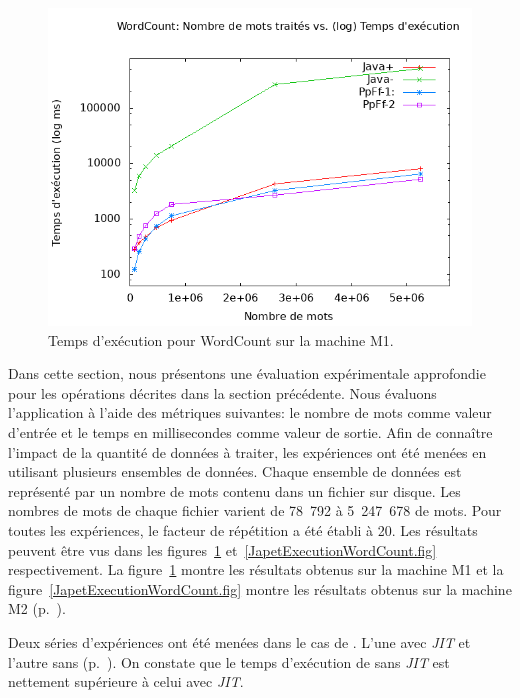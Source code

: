 \begin{figure}[H]
\centering
     \includegraphics[width=1.0\textwidth]{Figures/GrapheTempsWordCount.png}
      \caption{Temps d'ex\'ecution pour WordCount sur la machine M1.}
       \label{GrapheTempsWordCount.fig}
\end{figure}


Dans cette section, nous présentons une \'evaluation exp\'erimentale approfondie pour les op\'erations d\'ecrites dans la section pr\'ec\'edente. Nous \'evaluons l'application  \`a l'aide des m\'etriques suivantes: le nombre de mots comme valeur d'entr\'ee et le temps en millisecondes comme valeur de sortie. Afin de conna\^itre l'impact de la quantit\'e de donn\'ees \`a traiter, les exp\'eriences ont \'et\'e men\'ees en utilisant plusieurs ensembles de donn\'ees. Chaque ensemble de donn\'ees est repr\'esent\'e par un nombre de mots contenu dans un fichier sur disque. Les nombres de mots de chaque fichier varient de 78~792 \`a 5~247~678 de mots. Pour toutes les exp\'eriences, le facteur de r\'ep\'etition a \'et\'e \'etabli \`a 20.  Les r\'esultats peuvent \^etre vus dans les figures~\ref{GrapheTempsWordCount.fig} et~\ref{JapetExecutionWordCount.fig} respectivement. La figure~\ref{GrapheTempsWordCount.fig} montre les résultats obtenus sur la machine M1 et la figure~\ref{JapetExecutionWordCount.fig} montre les r\'esultats obtenus sur la machine M2 (p.~\pageref{machines.sect}).

Deux s\'eries d'exp\'eriences ont \'et\'e men\'ees dans le cas de . L'une avec \emph{JIT} et l'autre sans (p.~\pageref{jitDescription.sect}). On constate que le temps d'ex\'ecution de  sans \emph{JIT} est nettement sup\'erieure \`a celui avec \emph{JIT}.

